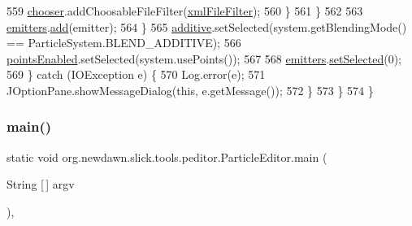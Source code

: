 \begin{DoxyCode}
559                             \mbox{\hyperlink{classorg_1_1newdawn_1_1slick_1_1tools_1_1peditor_1_1_particle_editor_a7a921beab5e50d8482810cf42136ee17}{chooser}}.addChoosableFileFilter(\mbox{\hyperlink{classorg_1_1newdawn_1_1slick_1_1tools_1_1peditor_1_1_particle_editor_af35ea81b927d60eeb1ec4d20e9a299a3}{xmlFileFilter}});
560                         \}
561                     \}
562                     
563                     \mbox{\hyperlink{classorg_1_1newdawn_1_1slick_1_1tools_1_1peditor_1_1_particle_editor_adf3a8d24a0adf9e68e06a87f37ff378a}{emitters}}.\mbox{\hyperlink{classorg_1_1newdawn_1_1slick_1_1tools_1_1peditor_1_1_emitter_list_a8917d12ded4e0e597c9ef64fa7812aee}{add}}(emitter);
564                 \}
565                 \mbox{\hyperlink{classorg_1_1newdawn_1_1slick_1_1tools_1_1peditor_1_1_particle_editor_a0d9d0e20f004cbd5e65f148b99b63093}{additive}}.setSelected(system.getBlendingMode() == ParticleSystem.BLEND\_ADDITIVE);
566                 \mbox{\hyperlink{classorg_1_1newdawn_1_1slick_1_1tools_1_1peditor_1_1_particle_editor_a06e9238557a48255d04a41dc2fba3b6f}{pointsEnabled}}.setSelected(system.usePoints());
567                 
568                 \mbox{\hyperlink{classorg_1_1newdawn_1_1slick_1_1tools_1_1peditor_1_1_particle_editor_adf3a8d24a0adf9e68e06a87f37ff378a}{emitters}}.\mbox{\hyperlink{classorg_1_1newdawn_1_1slick_1_1tools_1_1peditor_1_1_emitter_list_a2d4c1c8b76d20c25f3a7183ab5b4cd25}{setSelected}}(0);
569             \} \textcolor{keywordflow}{catch} (IOException e) \{
570                 Log.error(e);
571                 JOptionPane.showMessageDialog(\textcolor{keyword}{this}, e.getMessage());
572             \}
573         \}
574     \}
\end{DoxyCode}
\mbox{\label{classorg_1_1newdawn_1_1slick_1_1tools_1_1peditor_1_1_particle_editor_a51a63bbfa358bed2b30d9f9c37e61ee4}} 
\subsubsection{\texorpdfstring{main()}{main()}}
{\footnotesize\ttfamily static void org.\+newdawn.\+slick.\+tools.\+peditor.\+Particle\+Editor.\+main (\begin{DoxyParamCaption}\item[{String \mbox{[}$\,$\mbox{]}}]{argv }\end{DoxyParamCaption})\hspace{0.3cm}{\ttfamily [inline]}, {\ttfamily [static]}}

